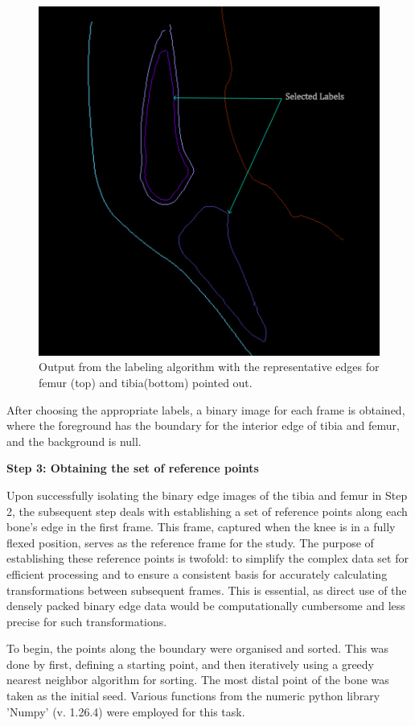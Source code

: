 \documentclass{micro-econ-thesis}
\begin{document}
\begin{figure}[H]
	\centering
	\includegraphics[width=0.7\linewidth]{label_selected}
	\caption{Output from the labeling algorithm with the representative edges for femur (top) and tibia(bottom) pointed out.}
	\label{fig:labelimg}
\end{figure}
 
After choosing the appropriate labels, a binary image for each frame is obtained, where the foreground has the boundary for the interior edge of tibia and femur, and the background is null.   

\textbf{Step 3: Obtaining the set of reference points}

Upon successfully isolating the binary edge images of the tibia and femur in Step 2, the subsequent step deals with establishing a set of reference points along each bone's edge in the first frame. This frame, captured when the knee is in a fully flexed position, serves as the reference frame for the study. The purpose of establishing these reference points is twofold: to simplify the complex data set for efficient processing and to ensure a consistent basis for accurately calculating transformations between subsequent frames. This is essential, as direct use of the densely packed binary edge data would be computationally cumbersome and less precise for such transformations.

To begin, the points along the boundary were organised and sorted. This was done by first, defining a starting point, and then iteratively using a greedy nearest neighbor algorithm for sorting. The most distal point of the bone was taken as the initial seed. Various functions from the numeric python library 'Numpy' (v. 1.26.4) were employed for this task. 
\end{document}
